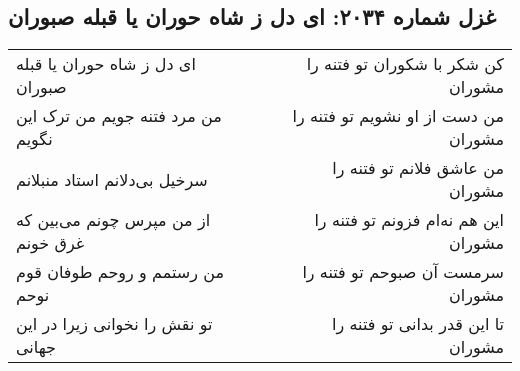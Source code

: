 \begin{center}
\section*{غزل شماره ۲۰۳۴: ای دل ز شاه حوران یا قبله صبوران}
\label{sec:2034}
\begin{longtable}{l p{0.5cm} r}
ای دل ز شاه حوران یا قبله صبوران
&&
کن شکر با شکوران تو فتنه را مشوران
\\
من مرد فتنه جویم من ترک این نگویم
&&
من دست از او نشویم تو فتنه را مشوران
\\
سرخیل بی‌دلانم استاد منبلانم
&&
من عاشق فلانم تو فتنه را مشوران
\\
از من مپرس چونم می‌بین که غرق خونم
&&
این هم نه‌ام فزونم تو فتنه را مشوران
\\
من رستمم و روحم طوفان قوم نوحم
&&
سرمست آن صبوحم تو فتنه را مشوران
\\
تو نقش را نخوانی زیرا در این جهانی
&&
تا این قدر بدانی تو فتنه را مشوران
\\
\end{longtable}
\end{center}
